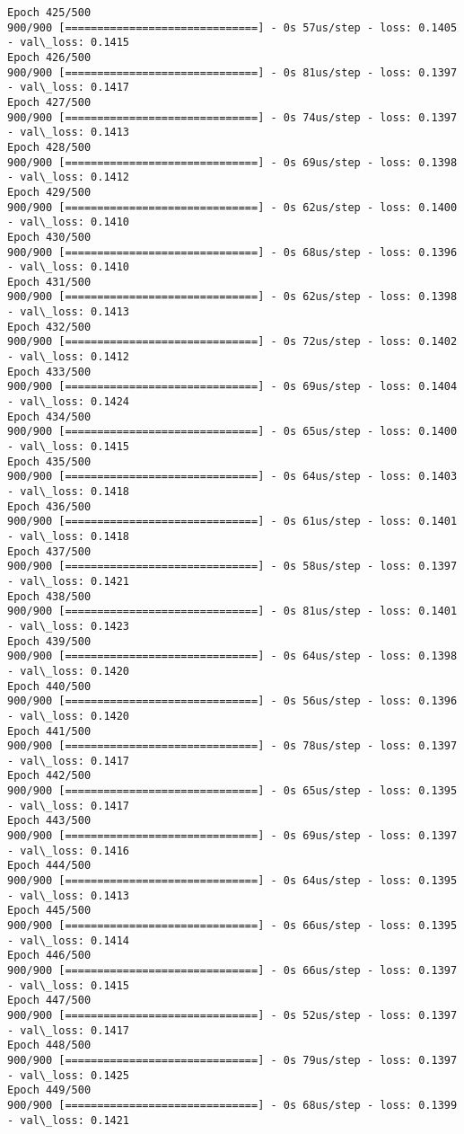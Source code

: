 \documentclass[11pt]{article}
\begin{document}
\begin{Verbatim}[commandchars=\\\{\}]
Epoch 425/500
900/900 [==============================] - 0s 57us/step - loss: 0.1405 - val\_loss: 0.1415
Epoch 426/500
900/900 [==============================] - 0s 81us/step - loss: 0.1397 - val\_loss: 0.1417
Epoch 427/500
900/900 [==============================] - 0s 74us/step - loss: 0.1397 - val\_loss: 0.1413
Epoch 428/500
900/900 [==============================] - 0s 69us/step - loss: 0.1398 - val\_loss: 0.1412
Epoch 429/500
900/900 [==============================] - 0s 62us/step - loss: 0.1400 - val\_loss: 0.1410
Epoch 430/500
900/900 [==============================] - 0s 68us/step - loss: 0.1396 - val\_loss: 0.1410
Epoch 431/500
900/900 [==============================] - 0s 62us/step - loss: 0.1398 - val\_loss: 0.1413
Epoch 432/500
900/900 [==============================] - 0s 72us/step - loss: 0.1402 - val\_loss: 0.1412
Epoch 433/500
900/900 [==============================] - 0s 69us/step - loss: 0.1404 - val\_loss: 0.1424
Epoch 434/500
900/900 [==============================] - 0s 65us/step - loss: 0.1400 - val\_loss: 0.1415
Epoch 435/500
900/900 [==============================] - 0s 64us/step - loss: 0.1403 - val\_loss: 0.1418
Epoch 436/500
900/900 [==============================] - 0s 61us/step - loss: 0.1401 - val\_loss: 0.1418
Epoch 437/500
900/900 [==============================] - 0s 58us/step - loss: 0.1397 - val\_loss: 0.1421
Epoch 438/500
900/900 [==============================] - 0s 81us/step - loss: 0.1401 - val\_loss: 0.1423
Epoch 439/500
900/900 [==============================] - 0s 64us/step - loss: 0.1398 - val\_loss: 0.1420
Epoch 440/500
900/900 [==============================] - 0s 56us/step - loss: 0.1396 - val\_loss: 0.1420
Epoch 441/500
900/900 [==============================] - 0s 78us/step - loss: 0.1397 - val\_loss: 0.1417
Epoch 442/500
900/900 [==============================] - 0s 65us/step - loss: 0.1395 - val\_loss: 0.1417
Epoch 443/500
900/900 [==============================] - 0s 69us/step - loss: 0.1397 - val\_loss: 0.1416
Epoch 444/500
900/900 [==============================] - 0s 64us/step - loss: 0.1395 - val\_loss: 0.1413
Epoch 445/500
900/900 [==============================] - 0s 66us/step - loss: 0.1395 - val\_loss: 0.1414
Epoch 446/500
900/900 [==============================] - 0s 66us/step - loss: 0.1397 - val\_loss: 0.1415
Epoch 447/500
900/900 [==============================] - 0s 52us/step - loss: 0.1397 - val\_loss: 0.1417
Epoch 448/500
900/900 [==============================] - 0s 79us/step - loss: 0.1397 - val\_loss: 0.1425
Epoch 449/500
900/900 [==============================] - 0s 68us/step - loss: 0.1399 - val\_loss: 0.1421

\end{Verbatim}
\end{document}
